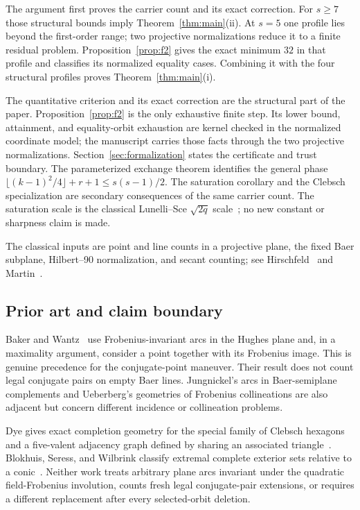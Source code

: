 The argument first proves the carrier count and its exact correction.  For
$s\ge7$ those structural bounds imply Theorem~\ref{thm:main}(ii).  At $s=5$
one profile lies beyond the first-order range; two projective normalizations
reduce it to a finite residual problem.  Proposition~\ref{prop:f2} gives the
exact minimum $32$ in that profile and classifies its normalized equality
cases.  Combining it with the four structural profiles proves
Theorem~\ref{thm:main}(i).

The quantitative criterion and its exact correction are the structural
part of the paper.  Proposition~\ref{prop:f2} is the only exhaustive finite
step.  Its lower bound, attainment, and equality-orbit exhaustion are kernel
checked in the normalized coordinate model; the manuscript carries those
facts through the two projective normalizations.  Section~\ref{sec:formalization}
states the certificate and trust boundary.  The parameterized exchange
theorem identifies the general phase
$\lfloor(k-1)^2/4\rfloor+r+1\le s(s-1)/2$.  The saturation corollary and the
Clebsch specialization are secondary consequences of the same carrier
count.  The saturation scale is the classical Lunelli--Sce $\sqrt{2q}$
scale~\cite{LunelliSce1964,BallLavrauw2019}; no new constant or sharpness
claim is made.

The classical inputs are point and line counts in a projective plane, the
fixed Baer subplane, Hilbert--90 normalization, and secant counting; see
Hirschfeld~\cite{Hirschfeld1998} and Martin~\cite{Martin1967}.

\subsection*{Prior art and claim boundary}

Baker and Wantz~\cite{BakerWantz2005} use Frobenius-invariant arcs in the
Hughes plane and, in a maximality argument, consider a point together with
its Frobenius image.  This is genuine precedence for the conjugate-point
maneuver.  Their result does not count legal conjugate pairs on empty Baer
lines.  Jungnickel's arcs in Baer-semiplane complements
\cite{Jungnickel1987} and Ueberberg's geometries of Frobenius collineations
\cite{Ueberberg1997} are also adjacent but concern different incidence or
collineation problems.

Dye gives exact completion geometry for the special family of Clebsch
hexagons and a five-valent adjacency graph defined by sharing an associated
triangle~\cite[Proposition~1 and Theorems~7--8, pp.~282--284]{Dye1991}.
Blokhuis, Seress, and Wilbrink classify extremal complete exterior sets
relative to a conic~\cite[pp.~143--146]{BlokhuisSeressWilbrink1992}.
Neither work treats arbitrary plane arcs invariant under the quadratic
field-Frobenius involution, counts fresh legal conjugate-pair extensions, or
requires a different replacement after every selected-orbit deletion.

